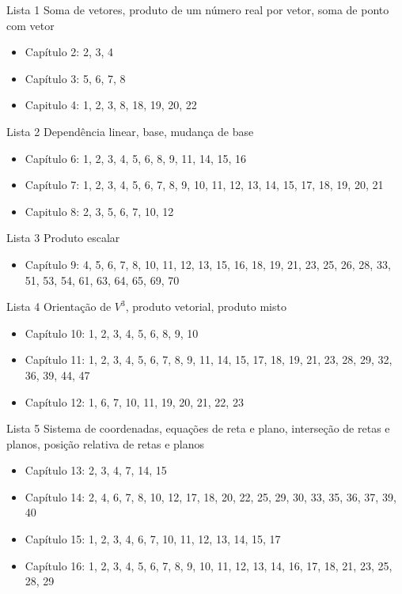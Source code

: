 \begin{frame}{Lista 1}
    Soma de vetores, produto de um número real por vetor, soma de ponto com vetor
    \begin{itemize}
        \item Capítulo 2: 2, 3, 4
        \item Capítulo 3: 5, 6, 7, 8
        \item Capitulo 4: 1, 2, 3, 8, 18, 19, 20, 22
    \end{itemize}
\end{frame}

\begin{frame}{Lista 2}
    Dependência linear, base, mudança de base
    \begin{itemize}
        \item Capítulo 6: 1, 2, 3, 4, 5, 6, 8, 9, 11, 14, 15, 16
        \item Capítulo 7: 1, 2, 3, 4, 5, 6, 7, 8, 9, 10, 11, 12, 13, 14, 15, 17, 18, 19, 20, 21 
        \item Capitulo 8: 2, 3, 5, 6, 7, 10, 12
    \end{itemize}
\end{frame}

\begin{frame}{Lista 3}
    Produto escalar
    \begin{itemize}
        \item Capítulo 9: 4, 5, 6, 7, 8, 10, 11, 12, 13, 15, 16, 18, 19, 21, 23, 25, 26, 28, 33, 51, 53, 54, 61, 63, 64, 65, 69, 70
    \end{itemize}
\end{frame}

\begin{frame}{Lista 4}
    Orientação de \(V^3\), produto vetorial, produto misto
    \begin{itemize}
        \item Capítulo 10: 1, 2, 3, 4, 5, 6, 8, 9, 10
        \item Capítulo 11: 1, 2, 3, 4, 5, 6, 7, 8, 9, 11, 14, 15, 17, 18, 19, 21, 23, 28, 29, 32, 36, 39, 44, 47
        \item Capítulo 12: 1, 6, 7, 10, 11, 19, 20, 21, 22, 23
    \end{itemize}
\end{frame}

\begin{frame}{Lista 5}
    Sistema de coordenadas, equações de reta e plano, interseção de retas e planos, posição relativa de retas e planos
    \begin{itemize}
        \item Capítulo 13: 2, 3, 4, 7, 14, 15
        \item Capítulo 14: 2, 4, 6, 7, 8, 10, 12, 17, 18, 20, 22, 25, 29, 30, 33, 35, 36, 37, 39, 40
        \item Capítulo 15: 1, 2, 3, 4, 6, 7, 10, 11, 12, 13, 14, 15, 17
        \item Capítulo 16: 1, 2, 3, 4, 5, 6, 7, 8, 9, 10, 11, 12, 13, 14, 16, 17, 18, 21, 23, 25, 28, 29
    \end{itemize}
\end{frame}

